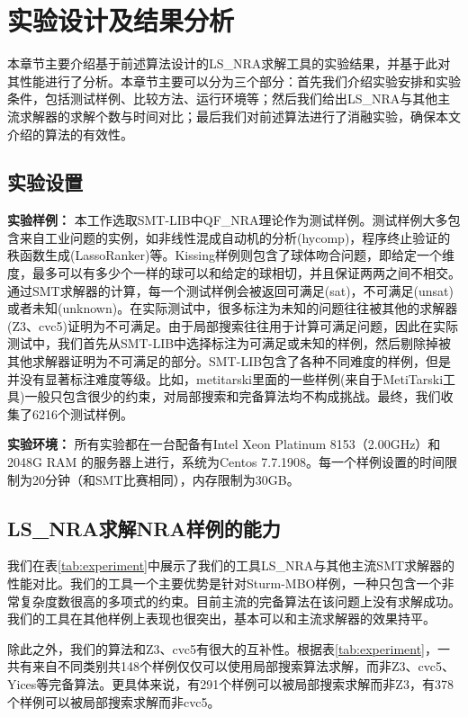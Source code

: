 \chapter{实验设计及结果分析}\label{chap:Result}

本章节主要介绍基于前述算法设计的LS\_NRA求解工具的实验结果，并基于此对其性能进行了分析。本章节主要可以分为三个部分：首先我们介绍实验安排和实验条件，包括测试样例、比较方法、运行环境等；然后我们给出LS\_NRA与其他主流求解器的求解个数与时间对比；最后我们对前述算法进行了消融实验，确保本文介绍的算法的有效性。

\section{实验设置}
\textbf{实验样例：} 本工作选取SMT-LIB中QF\_NRA理论作为测试样例。测试样例大多包含来自工业问题的实例，如非线性混成自动机的分析(hycomp)，程序终止验证的秩函数生成(LassoRanker)等。Kissing样例则包含了球体吻合问题，即给定一个维度，最多可以有多少个一样的球可以和给定的球相切，并且保证两两之间不相交。通过SMT求解器的计算，每一个测试样例会被返回可满足(sat)，不可满足(unsat)或者未知(unknown)。在实际测试中，很多标注为未知的问题往往被其他的求解器(Z3、cvc5)证明为不可满足。由于局部搜索往往用于计算可满足问题，因此在实际测试中，我们首先从SMT-LIB中选择标注为可满足或未知的样例，然后剔除掉被其他求解器证明为不可满足的部分。SMT-LIB包含了各种不同难度的样例，但是并没有显著标注难度等级。比如，metitarski里面的一些样例(来自于MetiTarski工具)一般只包含很少的约束，对局部搜索和完备算法均不构成挑战。最终，我们收集了6216个测试样例。


\textbf{实验环境：} 所有实验都在一台配备有Intel Xeon Platinum 8153（2.00GHz）和2048G RAM 的服务器上进行，系统为Centos 7.7.1908。每一个样例设置的时间限制为20分钟（和SMT比赛相同），内存限制为30GB。

\section{LS\_NRA求解NRA样例的能力}
我们在表\ref{tab:experiment}中展示了我们的工具LS\_NRA与其他主流SMT求解器的性能对比。我们的工具一个主要优势是针对Sturm-MBO样例，一种只包含一个非常复杂度数很高的多项式的约束。目前主流的完备算法在该问题上没有求解成功。我们的工具在其他样例上表现也很突出，基本可以和主流求解器的效果持平。

除此之外，我们的算法和Z3、cvc5有很大的互补性。根据表\ref{tab:experiment}，一共有来自不同类别共148个样例仅仅可以使用局部搜索算法求解，而非Z3、cvc5、Yices等完备算法。更具体来说，有291个样例可以被局部搜索求解而非Z3，有378个样例可以被局部搜索求解而非cvc5。

